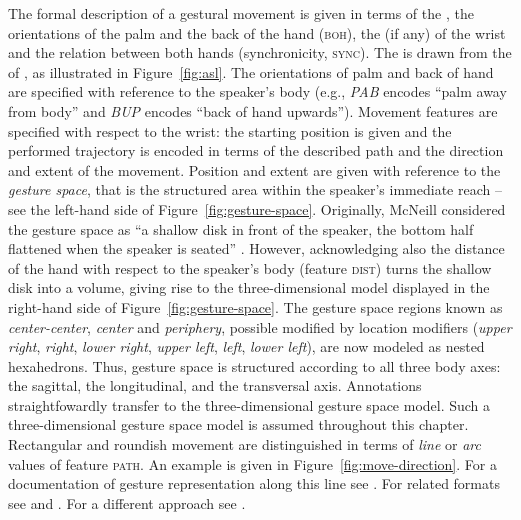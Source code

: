 \documentclass[output=paper]{langsci/langscibook}
\begin{document}
The formal description of a gestural movement is given in terms of the ,  the orientations of the palm  and the back of the hand (\textsc{boh}),  the  (if any) of the wrist  and the relation between both hands (synchronicity, \textsc{sync}). 
%
The  is drawn from the  of , as illustrated in Figure~\ref{fig:asl}.
%
The orientations  of palm and back of hand are specified with reference to the speaker's body (e.g., \textit{PAB} encodes \enquote{palm away from body} and \textit{BUP} encodes \enquote{back of hand upwards}). 
%
Movement features are specified with respect to the wrist: the starting position  is given and the performed trajectory is encoded in terms of the described path  and the direction  and extent  of the movement.
%
Position and extent are given with reference to the \emph{gesture space}, that is the structured area within the speaker's immediate reach \citep[--89]{McNeill:1992} -- see the left-hand side of Figure~\ref{fig:gesture-space}. 
%
Originally, McNeill considered the gesture space as \enquote{a shallow disk in front of the speaker, the bottom half flattened when the speaker is seated} \citep[]{McNeill:1992}. 
%
However, acknowledging also the distance of the hand with respect to the speaker's body (feature \textsc{dist}) turns the shallow disk into a volume, giving rise to the three-dimensional model displayed in the right-hand side of Figure~\ref{fig:gesture-space}.
%
The gesture space regions known as \emph{center-center}, \emph{center} and \emph{periphery}, possible modified by location modifiers (\emph{upper right}, \emph{right}, \emph{lower right}, \emph{upper left}, \emph{left}, \emph{lower left}), are now modeled as nested hexahedrons. 
%
Thus, gesture space is structured according to all three body axes: the sagittal, the longitudinal, and the transversal axis.
%
Annotations straightfowardly transfer to the three-dimensional gesture space model.
%
Such a three-dimensional gesture space model is assumed throughout this chapter.
%
Rectangular and roundish movement are distinguished in terms of \textit{line}  or \textit{arc}  values of feature \textsc{path}.
%
An example is given in Figure~\ref{fig:move-direction}.
%
For a documentation of gesture representation along this line see \citet{FIGURE:annotation}.
%
For related formats see \citet{Martell:2002} and \citet{Gibbon:et:al:2003}.
%
For a different approach see \citet{Lausberg:Sloetjes:2009}.
\end{document}
